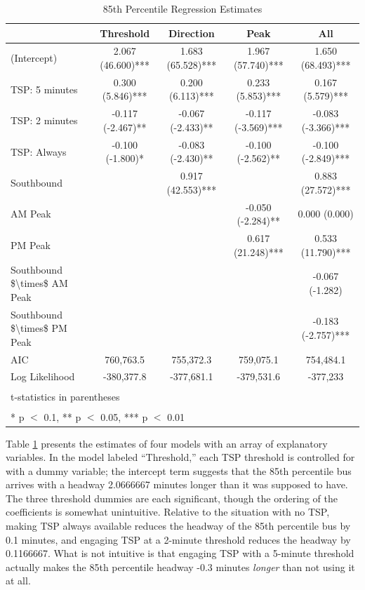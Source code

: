 \documentclass[3p, authoryear, review]{elsarticle} %
\begin{document}
\begin{table}

\caption{\label{tab:models}85th Percentile Regression Estimates}
\centering
\begin{tabular}[t]{lcccc}
\toprule
  & Threshold & Direction & Peak & All\\
\midrule
(Intercept) & 2.067 (46.600)*** & 1.683 (65.528)*** & 1.967 (57.740)*** & 1.650 (68.493)***\\
TSP: 5 minutes & 0.300 (5.846)*** & 0.200 (6.113)*** & 0.233 (5.853)*** & 0.167 (5.579)***\\
TSP: 2 minutes & -0.117 (-2.467)** & -0.067 (-2.433)** & -0.117 (-3.569)*** & -0.083 (-3.366)***\\
TSP: Always & -0.100 (-1.800)* & -0.083 (-2.430)** & -0.100 (-2.562)** & -0.100 (-2.849)***\\
Southbound &  & 0.917 (42.553)*** &  & 0.883 (27.572)***\\
AM Peak &  &  & -0.050 (-2.284)** & 0.000 (0.000)\\
PM Peak &  &  & 0.617 (21.248)*** & 0.533 (11.790)***\\
Southbound \$\textbackslash{}times\$ AM Peak &  &  &  & -0.067 (-1.282)\\
Southbound \$\textbackslash{}times\$ PM Peak &  &  &  & -0.183 (-2.757)***\\
\midrule
AIC & 760,763.5 & 755,372.3 & 759,075.1 & 754,484.1\\
Log Likelihood & -380,377.8 & -377,681.1 & -379,531.6 & -377,233\\
\bottomrule
\multicolumn{5}{l}{\textsuperscript{} t-statistics in parentheses}\\
\multicolumn{5}{l}{\textsuperscript{} * p $<$ 0.1, ** p $<$ 0.05, *** p $<$ 0.01}\\
\end{tabular}
\end{table}

Table \ref{tab:models} presents the estimates of four models with an array
of explanatory variables. In the model labeled ``Threshold,'' each TSP threshold
is controlled for with a dummy variable; the intercept term suggests that the
85th percentile bus arrives with a headway 2.0666667
minutes longer than it was supposed to have. The three threshold dummies are
each significant, though the ordering of the coefficients is somewhat unintuitive.
Relative to the situation with no TSP, making TSP always available reduces the
headway of the 85th percentile bus by 0.1
minutes, and engaging TSP at a 2-minute threshold reduces the headway by
0.1166667. What is not intuitive is that
engaging TSP with a 5-minute threshold actually makes the 85th percentile
headway -0.3 minutes \emph{longer} than
not using it at all.
\end{document}
